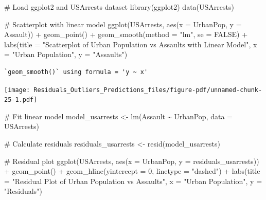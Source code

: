 \documentclass[
  letterpaper,
  DIV=11,
  numbers=noendperiod]{scrreprt}
\newenvironment{Shaded}{\begin{snugshade}}{\end{snugshade}}
\newcommand{\AttributeTok}[1]{\textcolor[rgb]{0.40,0.45,0.13}{#1}}
\newcommand{\CommentTok}[1]{\textcolor[rgb]{0.37,0.37,0.37}{#1}}
\newcommand{\ConstantTok}[1]{\textcolor[rgb]{0.56,0.35,0.01}{#1}}
\newcommand{\DecValTok}[1]{\textcolor[rgb]{0.68,0.00,0.00}{#1}}
\newcommand{\FunctionTok}[1]{\textcolor[rgb]{0.28,0.35,0.67}{#1}}
\newcommand{\NormalTok}[1]{\textcolor[rgb]{0.00,0.23,0.31}{#1}}
\newcommand{\OtherTok}[1]{\textcolor[rgb]{0.00,0.23,0.31}{#1}}
\newcommand{\SpecialCharTok}[1]{\textcolor[rgb]{0.37,0.37,0.37}{#1}}
\newcommand{\StringTok}[1]{\textcolor[rgb]{0.13,0.47,0.30}{#1}}
\begin{document}
\begin{Shaded}
\begin{Highlighting}[]
\CommentTok{\# Load ggplot2 and USArrests dataset}
\FunctionTok{library}\NormalTok{(ggplot2)}
\FunctionTok{data}\NormalTok{(USArrests)}

\CommentTok{\# Scatterplot with linear model}
\FunctionTok{ggplot}\NormalTok{(USArrests, }\FunctionTok{aes}\NormalTok{(}\AttributeTok{x =}\NormalTok{ UrbanPop, }\AttributeTok{y =}\NormalTok{ Assault)) }\SpecialCharTok{+}
  \FunctionTok{geom\_point}\NormalTok{() }\SpecialCharTok{+}
  \FunctionTok{geom\_smooth}\NormalTok{(}\AttributeTok{method =} \StringTok{"lm"}\NormalTok{, }\AttributeTok{se =} \ConstantTok{FALSE}\NormalTok{) }\SpecialCharTok{+}
  \FunctionTok{labs}\NormalTok{(}\AttributeTok{title =} \StringTok{"Scatterplot of Urban Population vs Assaults with Linear Model"}\NormalTok{, }\AttributeTok{x =} \StringTok{"Urban Population"}\NormalTok{, }\AttributeTok{y =} \StringTok{"Assaults"}\NormalTok{)}
\end{Highlighting}
\end{Shaded}

\begin{verbatim}
`geom_smooth()` using formula = 'y ~ x'
\end{verbatim}

\texttt{[image: Residuals\_Outliers\_Predictions\_files/figure-pdf/unnamed-chunk-25-1.pdf]}

\begin{Shaded}
\begin{Highlighting}[]
\CommentTok{\# Fit linear model}
\NormalTok{model\_usarrests }\OtherTok{\textless{}{-}} \FunctionTok{lm}\NormalTok{(Assault }\SpecialCharTok{\textasciitilde{}}\NormalTok{ UrbanPop, }\AttributeTok{data =}\NormalTok{ USArrests)}

\CommentTok{\# Calculate residuals}
\NormalTok{residuals\_usarrests }\OtherTok{\textless{}{-}} \FunctionTok{resid}\NormalTok{(model\_usarrests)}

\CommentTok{\# Residual plot}
\FunctionTok{ggplot}\NormalTok{(USArrests, }\FunctionTok{aes}\NormalTok{(}\AttributeTok{x =}\NormalTok{ UrbanPop, }\AttributeTok{y =}\NormalTok{ residuals\_usarrests)) }\SpecialCharTok{+}
  \FunctionTok{geom\_point}\NormalTok{() }\SpecialCharTok{+}
  \FunctionTok{geom\_hline}\NormalTok{(}\AttributeTok{yintercept =} \DecValTok{0}\NormalTok{, }\AttributeTok{linetype =} \StringTok{"dashed"}\NormalTok{) }\SpecialCharTok{+}
  \FunctionTok{labs}\NormalTok{(}\AttributeTok{title =} \StringTok{"Residual Plot of Urban Population vs Assaults"}\NormalTok{, }\AttributeTok{x =} \StringTok{"Urban Population"}\NormalTok{, }\AttributeTok{y =} \StringTok{"Residuals"}\NormalTok{)}
\end{Highlighting}
\end{Shaded}
\end{document}
